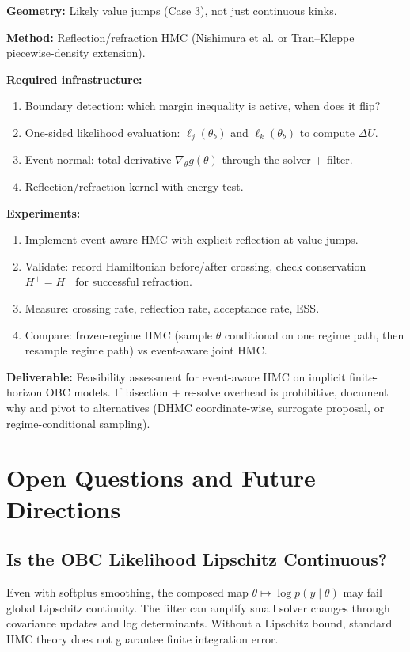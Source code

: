 \textbf{Geometry:} Likely value jumps (Case 3), not just continuous kinks.

\textbf{Method:} Reflection/refraction HMC (Nishimura et al. or Tran--Kleppe
piecewise-density extension).

\textbf{Required infrastructure:}
\begin{enumerate}
  \item Boundary detection: which margin inequality is active, when does it
    flip?
  \item One-sided likelihood evaluation: $\ell_j(\theta_b)$ and
    $\ell_k(\theta_b)$ to compute $\Delta U$.
  \item Event normal: total derivative $\nabla_\theta g(\theta)$ through the
    solver + filter.
  \item Reflection/refraction kernel with energy test.
\end{enumerate}

\textbf{Experiments:}
\begin{enumerate}
  \item Implement event-aware HMC with explicit reflection at value jumps.
  \item Validate: record Hamiltonian before/after crossing, check conservation
    $H^+ = H^-$ for successful refraction.
  \item Measure: crossing rate, reflection rate, acceptance rate, ESS.
  \item Compare: frozen-regime HMC (sample $\theta$ conditional on one regime
    path, then resample regime path) vs event-aware joint HMC.
\end{enumerate}

\textbf{Deliverable:} Feasibility assessment for event-aware HMC on implicit
finite-horizon OBC models. If bisection + re-solve overhead is prohibitive,
document why and pivot to alternatives (DHMC coordinate-wise, surrogate
proposal, or regime-conditional sampling).

\section{Open Questions and Future Directions}

\subsection{Is the OBC Likelihood Lipschitz Continuous?}

Even with softplus smoothing, the composed map $\theta \mapsto \log p(y \mid
\theta)$ may fail global Lipschitz continuity. The filter can amplify small
solver changes through covariance updates and log determinants. Without a
Lipschitz bound, standard HMC theory does not guarantee finite integration
error.

